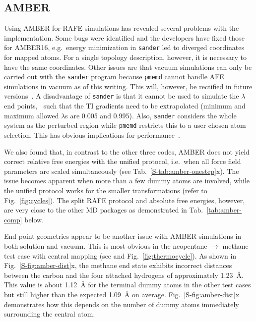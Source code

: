 \documentclass[journal=jctcce,manuscript=article]{achemso}
\newcommand{\progname}[1]{\texttt{#1}}
\begin{document}
\subsection{AMBER}
\label{sec:amber-results}

Using AMBER for RAFE simulations has revealed several problems with the implementation.  Some bugs were identified and the developers have fixed those for AMBER16, e.g.\ energy minimization in \progname{sander} led to
diverged coordinates for mapped atoms.  For a single topology description,
however, it is necessary to have the same coordinates.  Other issues are that
vacuum simulations can only be carried out with the \progname{sander} program
because \progname{pmemd} cannot handle AFE simulations in vacuum as of this writing.  This will, however, be rectified in future
versions~\cite{doi:10.1021/acs.jctc.7b00102}.  A disadvantage of
\progname{sander} is that it cannot be used to simulate the $\lambda$ end
points,~\cite{doi:10.1021/ct400340s} such that the TI gradients need to be
extrapolated (minimum and maximum allowed $\lambda$s are 0.005 and 0.995).
Also, \progname{sander} considers the whole system as the perturbed
region while \progname{pmemd} restricts this to a user chosen atom selection.
This has obvious implications for performance~\cite{doi:10.1021/ct400340s}.

We also found that, in contrast to the other three codes, AMBER does not yield
correct relative free energies with the unified protocol, i.e.\
when all force field parameters are scaled simultaneously (see
Tab.~\ref{S-tab:amber-onestep}x). The issue becomes apparent when more than a few dummy atoms are involved, while the unified protocol works for the
smaller transformations (refer to Fig.~\ref{fig:cycles}).  The split RAFE
protocol and absolute free energies, however, are very close to the other MD
packages as demonstrated in Tab.~\ref{tab:amber-comp} below.

End point geometries appear to be another issue with AMBER simulations
in both solution and vacuum.  This is most obvious in the neopentane
$\rightarrow$ methane test case with central mapping (see
 and Fig.~\ref{fig:thermocycle}).
As shown in Fig.~\ref{S-fig:amber-dist}x, the methane end state exhibits
incorrect distances between the carbon and the four
attached hydrogens of approximately \SI{1.23}{\angstrom}.  This value is about
\SI{1.12}{\angstrom} for the terminal dummy atoms in the other test cases but
still higher than the expected \SI{1.09}{\angstrom} on average.
Fig.~\ref{S-fig:amber-dist}x demonstrates how this depends on the number of
dummy atoms immediately surrounding the central atom.
\end{document}
